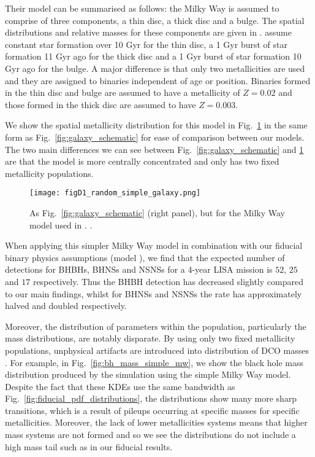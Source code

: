 Their model can be summarised as follows: the Milky Way is assumed to comprise of three components, a thin disc, a thick disc and a bulge. The spatial distributions and relative masses for these components are given in \citet{McMillan+2011}. \citet{Breivik+2020} assume constant star formation over 10 Gyr for the thin disc, a 1 Gyr burst of star formation 11 Gyr ago for the thick disc and a 1 Gyr burst of star formation 10 Gyr ago for the bulge. A major difference is that only two metallicities are used and they are assigned to binaries independent of age or position. Binaries formed in the thin disc and bulge are assumed to have a metallicity of $Z = 0.02$ and those formed in the thick disc are assumed to have $Z = 0.003$.

We show the spatial metallicity distribution for this model in Fig.~\ref{fig:simple_mw} in the same form as Fig.~\ref{fig:galaxy_schematic} for ease of comparison between our models. The two main differences we can see between Fig.~\ref{fig:galaxy_schematic} and \ref{fig:simple_mw} are that the \citet{Breivik+2020} model is more centrally concentrated and only has two fixed metallicity populations.

\begin{figure}[htb]
    \centering
    \texttt{[image: figD1\_random\_simple\_galaxy.png]}
    \caption{As Fig.~\ref{fig:galaxy_schematic} (right panel), but for the Milky Way model used in \citet{Breivik+2020}.  \href{https://github.com/TomWagg/detecting-DCOs-in-LISA/blob/main/paper/figures/figD1_random_simple_galaxy.png}{\faFileImage} \href{https://github.com/TomWagg/detecting-DCOs-in-LISA/blob/main/paper/figure_notebooks/galaxy_creation_station.ipynb}{\faBook}.}
    \label{fig:simple_mw}
\end{figure}

When applying this simpler Milky Way model in combination with our fiducial binary physics assumptions (model \modFid{}), we find that the expected number of detections for BHBHs, BHNSs and NSNSs for a 4-year LISA mission is $52$, $25$ and $17$ respectively. Thus the BHBH detection has decreased slightly compared to our main findings, whilst for BHNSs and NSNSs the rate has approximately halved and doubled respectively.

Moreover, the distribution of parameters within the population, particularly the mass distributions, are notably disparate. By using only two fixed metallicity populations, unphysical artifacts are introduced into distribution of DCO masses \citep[e.g.][]{Dominik+2015, Neijssel+2019, Kummer_thesis}. For example, in Fig.~\ref{fig:bh_mass_simple_mw}, we show the black hole mass distribution produced by the simulation using the simple Milky Way model. Despite the fact that these KDEs use the same bandwidth as Fig.~\ref{fig:fiducial_pdf_distributions}, the distributions show many more sharp transitions, which is a result of pileups occurring at specific masses for specific metallicities. Moreover, the lack of lower metallicities systems means that higher mass systems are not formed and so we see the distributions do not include a high mass tail such as in our fiducial results.

